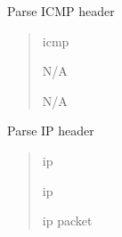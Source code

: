 \documentclass[letterpaper,10pt,english]{sphinxmanual}
\begin{document}
\begin{fulllineitems}
\label{\detokenize{modules/parse_mssg:parse_mssg.parse_icmp}}
\pysigstartsignatures
\pysiglinewithargsret
{}
{}
{}
\pysigstopsignatures
\sphinxAtStartPar
Parse ICMP header
\begin{quote}\begin{description}
\sphinxAtStartPar
{} \textendash{} icmp

\sphinxAtStartPar
N/A

\sphinxAtStartPar
N/A

\end{description}\end{quote}

\end{fulllineitems}


\begin{fulllineitems}
\label{\detokenize{modules/parse_mssg:parse_mssg.parse_ip}}
\pysigstartsignatures
\pysiglinewithargsret
{}
{}
{}
\pysigstopsignatures
\sphinxAtStartPar
Parse IP header
\begin{quote}\begin{description}
\sphinxAtStartPar
{} \textendash{} ip

\sphinxAtStartPar
ip

\sphinxAtStartPar
ip packet

\end{description}\end{quote}

\end{fulllineitems}

\end{document}
